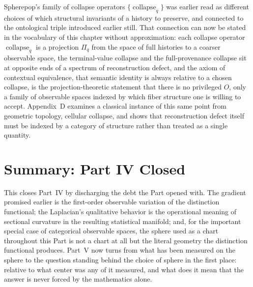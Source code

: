 \documentclass[11pt,fleqn]{book}
\numberwithin{equation}{chapter}
\theoremstyle{plain}
\theoremstyle{definition}
\theoremstyle{remark}
\providecommand{\scollapse}[1]{\operatorname{collapse}_{#1}}
\providecommand{\Tset}{\mathcal{T}}
\begin{document}
Spherepop's family of collapse operators \(\{\scollapse{q}\}\) was earlier read as different choices of which structural invariants of a history to preserve, and connected to the ontological triple introduced earlier still. That connection can now be stated in the vocabulary of this chapter without approximation: each collapse operator \(\scollapse{q}\) is a projection \(\Pi_q\) from the space of full histories to a coarser observable space, the terminal-value collapse and the full-provenance collapse sit at opposite ends of a spectrum of reconstruction defect, and the axiom of contextual equivalence, that semantic identity is always relative to a chosen collapse, is the projection-theoretic statement that there is no privileged \(O\), only a family of observable spaces indexed by which fiber structure one is willing to accept. Appendix~D examines a classical instance of this same point from geometric topology, cellular collapse, and shows that reconstruction defect itself must be indexed by a category of structure rather than treated as a single quantity.

\section{Summary: Part IV Closed}

This closes Part~IV by discharging the debt the Part opened with. The gradient promised earlier is the first-order observable variation of the distinction functional; the Laplacian's qualitative behavior is the operational meaning of sectional curvature in the resulting statistical manifold; and, for the important special case of categorical observable spaces, the sphere used as a chart throughout this Part is not a chart at all but the literal geometry the distinction functional produces. Part~V now turns from what has been measured on the sphere to the question standing behind the choice of sphere in the first place: relative to what center was any of it measured, and what does it mean that the answer is never forced by the mathematics alone.


\providecommand{\Tset}{\mathcal{T}}
\end{document}

